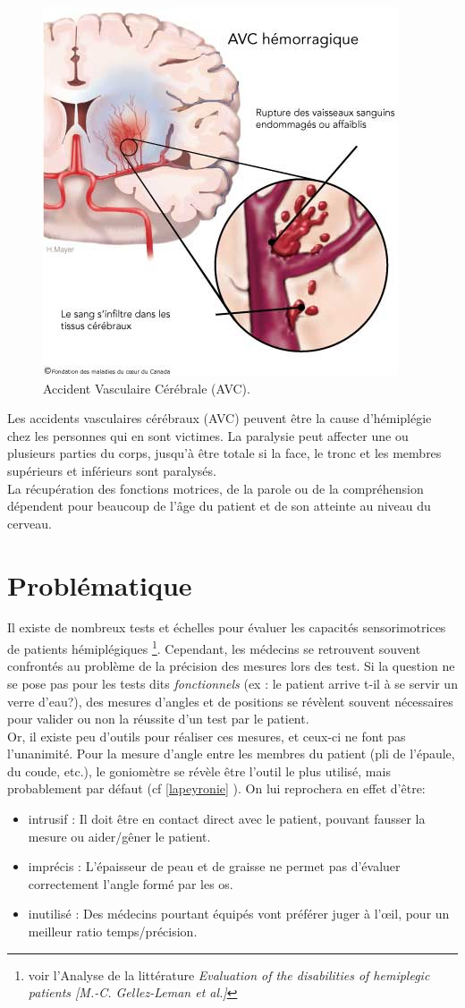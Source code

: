 \begin{figure}[h!]
\centering
\includegraphics[width=0.5\linewidth]{images/avc}
\caption{Accident Vasculaire Cérébrale (AVC).}
\end{figure}

Les accidents vasculaires cérébraux (AVC) peuvent être la cause d'hémiplégie chez les personnes qui en sont victimes. La paralysie peut affecter une ou plusieurs parties du corps, jusqu'à être totale si la face, le tronc et les membres supérieurs et inférieurs sont paralysés. \\
La récupération des fonctions motrices, de la parole ou de la compréhension dépendent pour beaucoup de l'âge du patient et de son atteinte au niveau du cerveau.
    \section{Problématique}
Il existe de nombreux tests et échelles pour évaluer les capacités sensorimotrices de patients hémiplégiques \footnote{voir l'Analyse de la littérature \textit{Evaluation of the disabilities of hemiplegic patients [M.-C. Gellez-Leman et al.]}}. Cependant, les médecins se retrouvent souvent confrontés au problème de la précision des mesures lors des test. Si la question ne se pose pas pour les tests dits \textit{fonctionnels} (ex : le patient arrive t-il à se servir un verre d'eau?), des mesures d'angles et de positions se révèlent souvent nécessaires pour valider ou non la réussite d'un test par le patient.
\\Or, il existe peu d'outils pour réaliser ces mesures, et ceux-ci ne font pas l'unanimité. Pour la mesure d'angle entre les membres du patient (pli de l'épaule, du coude, etc.), le goniomètre se révèle être l'outil le plus utilisé, mais probablement par défaut (cf \ref{lapeyronie} ). On lui reprochera en effet d'être: 
\begin{itemize}
  \item {intrusif :} Il doit être en contact direct avec le patient, pouvant fausser la mesure ou aider/gêner le patient.
  \item {imprécis :} L'épaisseur de peau et de graisse ne permet pas d'évaluer correctement l'angle formé par les os.
  \item {inutilisé :} Des médecins pourtant équipés vont préférer juger à l'œil, pour un meilleur ratio temps/précision.
\end{itemize}

